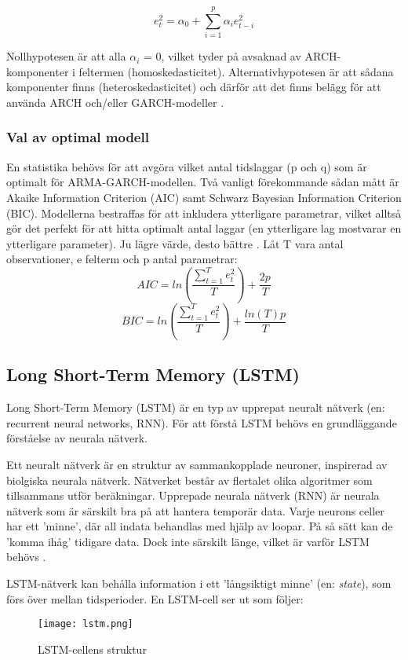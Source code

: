 \documentclass[12pt]{article}
\begin{document}
\begin{equation}
    e_t^2=\alpha_0+\sum_{i=1}^{p}\alpha_ie_{t-i}^2
\end{equation}

Nollhypotesen är att alla \(\alpha_i\) = 0, vilket tyder på avsaknad av ARCH-komponenter i feltermen (homoskedasticitet). Alternativhypotesen är att sådana komponenter finns (heteroskedasticitet) och därför att det finns belägg för att använda ARCH och/eller GARCH-modeller \parencite{engle1982autoregressive}. \par

\subsubsection{Val av optimal modell}
En statistika behövs för att avgöra vilket antal tidslaggar (p och q) som är optimalt för ARMA-GARCH-modellen. Två vanligt förekommande sådan mått är Akaike Information Criterion (AIC) samt Schwarz Bayesian Information Criterion (BIC). Modellerna bestraffas för att inkludera ytterligare parametrar, vilket alltså gör det perfekt för att hitta optimalt antal laggar (en ytterligare lag mostvarar en ytterligare parameter). Ju lägre värde, desto bättre \parencite{montgomery2015forecasting}. Låt T vara antal observationer, e felterm och p antal parametrar:
\begin{equation}
    AIC = ln\left( \frac{\sum_{t=1}^{T}e^2_t}{T} \right)+\frac{2p}{T}
\end{equation}
\begin{equation}
    BIC = ln\left( \frac{\sum_{t=1}^{T}e^2_t}{T} \right)+\frac{ln(T)p}{T}
\end{equation}


\subsection{Long Short-Term Memory (LSTM)}
Long Short-Term Memory (LSTM) är en typ av upprepat neuralt nätverk (en: recurrent neural networks, RNN). För att förstå LSTM behövs en grundläggande förståelse av neurala nätverk. \par

Ett neuralt nätverk är en struktur av sammankopplade neuroner, inspirerad av biolgiska neurala nätverk. Nätverket består av flertalet olika algoritmer som tillsammans utför beräkningar. Upprepade neurala nätverk (RNN) är neurala nätverk som är särskilt bra på att hantera temporär data. Varje neurons celler har ett 'minne', där all indata behandlas med hjälp av loopar. På så sätt kan de 'komma ihåg' tidigare data. Dock inte särskilt länge, vilket är varför LSTM behövs \parencite{purkait2019hands}. \par
LSTM-nätverk kan behålla information i ett 'långsiktigt minne' (en: \textit{state}), som förs över mellan tidsperioder. En LSTM-cell ser ut som följer:
\begin{figure}[H]
\caption{LSTM-cellens struktur \parencite[lånad från][]{yuan2019nonlinear}}
\texttt{[image: lstm.png]}
\centering
\end{figure}
\end{document}
